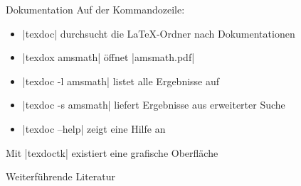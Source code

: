\documentclass[
	vorläufig=false,
	aspectratio=1610,
	datum=2018-10-22,
	titel={Allgemeine Formatierung und Pakete},
	web=true,
	max,
]{../tex/latexkurs-slides}
\begin{document}
\begin{frame}[fragile]{Dokumentation}
	Auf der Kommandozeile:
	\begin{itemize}
		\item |texdoc| durchsucht die \LaTeX-Ordner nach Dokumentationen
		\item |texdox amsmath| öffnet |amsmath.pdf|
		\item |texdoc -l amsmath| listet alle Ergebnisse auf
		\item |texdoc -s amsmath| liefert Ergebnisse aus erweiterter Suche
		\item |texdoc --help| zeigt eine Hilfe an
	\end{itemize}
	Mit |texdoctk| existiert eine grafische Oberfläche
\end{frame}



\nocite{kohm:satzspiegel, microtype, detailtypo, bringhurst}
\begin{frame}[allowframebreaks]{Weiterführende Literatur}
\printbibliography
\end{frame}
\end{document}
